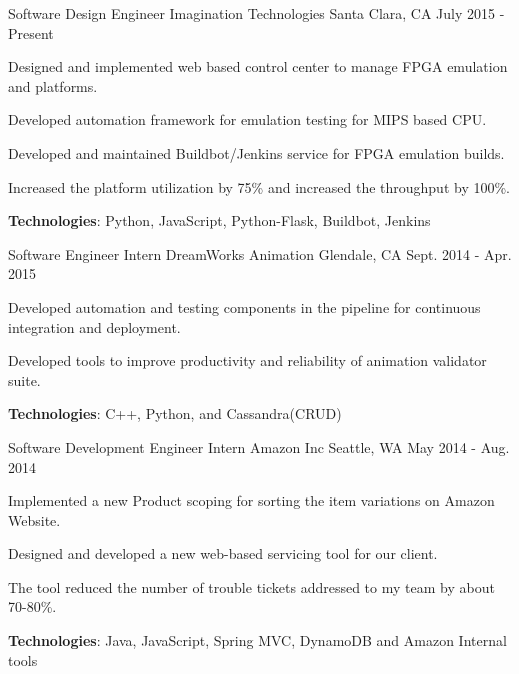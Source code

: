 \begin{cventries}
  \cventry
    {Software Design Engineer}
    {Imagination Technologies}
    {Santa Clara, CA}
    {July 2015 - Present}
    {
      \begin{cvitems}
        \item {Designed and implemented web based control center to manage FPGA emulation and platforms.}
        \item {Developed automation framework for emulation testing for MIPS based CPU.}                
        \item {Developed and maintained Buildbot/Jenkins service for FPGA emulation builds.}
        \item {Increased the platform utilization by 75\% and increased the throughput by 100\%.}
        \item {\textbf{Technologies}: Python, JavaScript, Python-Flask, Buildbot, Jenkins}
      \end{cvitems}
    }
    {}
    {}
  \cventry
    {Software Engineer Intern}
    {DreamWorks Animation}
    {Glendale, CA}
    {Sept. 2014 - Apr. 2015}
    {
      \begin{cvitems}
        \item {Developed automation and testing components in the pipeline for continuous integration and deployment.}
        \item {Developed tools to improve productivity and reliability of animation validator suite.}
        \item {\textbf{Technologies}: C++, Python, and Cassandra(CRUD)}
      \end{cvitems}
    }
    {}
    {}
  \cventry
    {Software Development Engineer Intern}
    {Amazon Inc}
    {Seattle, WA}
    {May 2014 - Aug. 2014}
    {
      \begin{cvitems}
        \item {Implemented a new Product scoping for sorting the item variations on Amazon Website.}
        \item {Designed and developed a new web-based servicing tool for our client.}
        \item {The tool reduced the number of trouble tickets addressed to my team by about 70-80\%.}
        \item {\textbf{Technologies}: Java, JavaScript, Spring MVC, DynamoDB and Amazon Internal tools}
      \end{cvitems} 
    }
    {}
    {}
    
\end{cventries}
